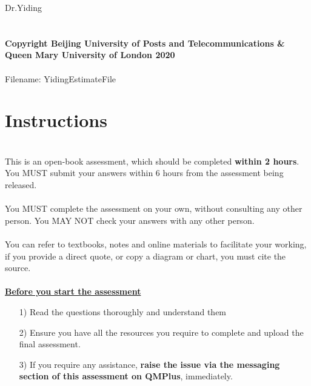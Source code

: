 \documentclass[11pt]{article}
\begin{document}
	\hspace{2em}Dr.Yiding
	~\\~\\~\\
	\textbf{\footnotesize Copyright  Beijing University of Posts and Telecommunications \&  Queen Mary University of London 2020}\\
	~\\
	Filename: YidingEstimateFile
	
	
	\newpage
	\thispagestyle{empty}
	\part*{{\Large Instructions}}
	~\\
	This is an open-book assessment, which should be completed \textbf{within 2 hours}. You MUST submit your answers within 6 hours from the assessment being released.\\
	~\\
	
	You MUST complete the assessment on your own, without consulting any other person. You MAY NOT check your answers with any other person.\\
	~\\
	
	You can refer to textbooks, notes and online materials to facilitate your working, if you provide a direct quote, or copy a diagram or chart, you must cite the source.\\
	~\\
	
	\textbf{\underline{Before you start the assessment}}
	\begin{enumerate}
		\item[1) ] Read the questions thoroughly and understand them
		\item[2) ] Ensure you have all the resources you require to complete and upload the final assessment.
		\item[3) ] If you require any assistance, \textbf{raise the issue via the messaging section of this assessment on QMPlus}, immediately.
	\end{enumerate}
	~\\
	
\end{document}
